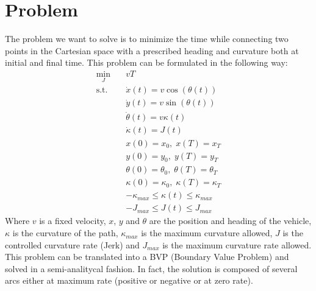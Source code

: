 \documentclass[11pt,twocolumn]{scrartcl}
\begin{document}
\section*{Problem}
%
The problem we want to solve is to minimize the time while connecting two points in the Cartesian space with a prescribed heading and curvature both at initial and final time. This problem can be formulated in the following way:
%
\begin{equation}
  \begin{split}
    \min_{J} \quad & v T \\ 
    \text{s.t.} \quad
      &\dot{x}(t)      = v \cos(\theta(t)) \\
      &\dot{y}(t)      = v \sin(\theta(t)) \\
      &\dot{\theta}(t) = v \kappa(t)       \\
      &\dot{\kappa}(t) = J(t)              \\
      &x(0)      = x_0,      \; x(T)      = x_T     \\
      &y(0)      = y_0,      \; y(T)      = y_T     \\
      &\theta(0) = \theta_0, \; \theta(T) = \theta_T\\
      &\kappa(0) = \kappa_0, \; \kappa(T) = \kappa_T\\
      &-\kappa_{max} \le \kappa(t) \le \kappa_{max} \\
      &-J_{max} \le J(t) \le J_{max}
  \end{split}
\end{equation}
%
Where $v$ is a fixed velocity, $x$, $y$ and $\theta$ are the position and heading of the vehicle, $\kappa$ is the curvature of the path, $\kappa_{max}$ is the maximum curvature allowed, $J$ is the controlled curvature rate (Jerk) and $J_{max}$ is the maximum curvature rate allowed.\\
%
This problem can be translated into a BVP (Boundary Value Problem) and solved in a semi-analitycal fashion. In fact, the solution is composed of several arcs either at maximum rate (positive or negative or at zero rate). 
%
\end{document}
